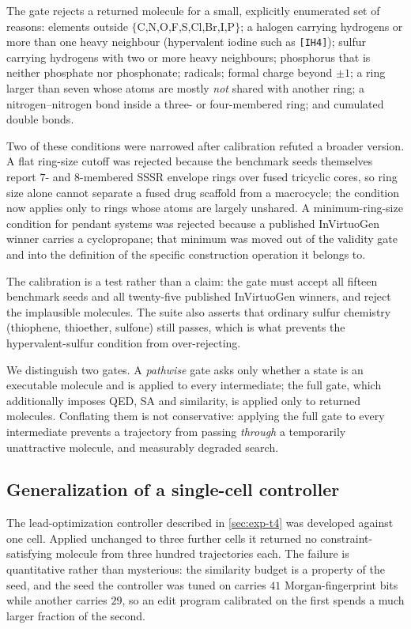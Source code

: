 The gate rejects a returned molecule for a small, explicitly enumerated set of
reasons: elements outside $\{$C,N,O,F,S,Cl,Br,I,P$\}$; a halogen carrying
hydrogens or more than one heavy neighbour (hypervalent iodine such as
\texttt{[IH4]}); sulfur carrying hydrogens with two or more heavy neighbours;
phosphorus that is neither phosphate nor phosphonate; radicals; formal charge
beyond $\pm1$; a ring larger than seven whose atoms are mostly \emph{not}
shared with another ring; a nitrogen--nitrogen bond inside a three- or
four-membered ring; and cumulated double bonds.

Two of these conditions were narrowed after calibration refuted a broader
version. A flat ring-size cutoff was rejected because the benchmark seeds
themselves report $7$- and $8$-membered SSSR envelope rings over fused
tricyclic cores, so ring size alone cannot separate a fused drug scaffold from
a macrocycle; the condition now applies only to rings whose atoms are largely
unshared. A minimum-ring-size condition for pendant systems was rejected
because a published InVirtuoGen winner carries a cyclopropane; that minimum was
moved out of the validity gate and into the definition of the specific
construction operation it belongs to.

The calibration is a test rather than a claim: the gate must accept all fifteen
benchmark seeds and all twenty-five published InVirtuoGen winners, and reject
the implausible molecules. The suite also asserts that ordinary sulfur
chemistry (thiophene, thioether, sulfone) still passes, which is what prevents
the hypervalent-sulfur condition from over-rejecting.

We distinguish two gates. A \emph{pathwise} gate asks only whether a state is an
executable molecule and is applied to every intermediate; the full gate, which
additionally imposes QED, SA and similarity, is applied only to returned
molecules. Conflating them is not conservative: applying the full gate to every
intermediate prevents a trajectory from passing \emph{through} a temporarily
unattractive molecule, and measurably degraded search.

\subsection{Generalization of a single-cell controller}
\label{app:t4-generalization}

The lead-optimization controller described in \cref{sec:exp-t4} was developed
against one cell. Applied unchanged to three further cells it returned no
constraint-satisfying molecule from three hundred trajectories each. The
failure is quantitative rather than mysterious: the similarity budget is a
property of the seed, and the seed the controller was tuned on carries $41$
Morgan-fingerprint bits while another carries $29$, so an edit program
calibrated on the first spends a much larger fraction of the second.

